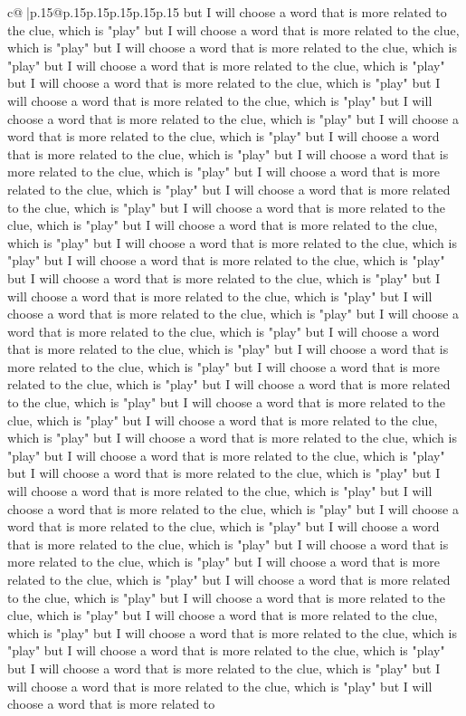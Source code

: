 \documentclass{article}
\begin{document}
{\begin{supertabular}{c@{$\;$}|p{.15\linewidth}@{}p{.15\linewidth}p{.15\linewidth}p{.15\linewidth}p{.15\linewidth}p{.15\linewidth}}
{{{but I will choose a word that is more related to the clue, which is "play" but I will choose a word that is more related to the clue, which is "play" but I will choose a word that is more related to the clue, which is "play" but I will choose a word that is more related to the clue, which is "play" but I will choose a word that is more related to the clue, which is "play" but I will choose a word that is more related to the clue, which is "play" but I will choose a word that is more related to the clue, which is "play" but I will choose a word that is more related to the clue, which is "play" but I will choose a word that is more related to the clue, which is "play" but I will choose a word that is more related to the clue, which is "play" but I will choose a word that is more related to the clue, which is "play" but I will choose a word that is more related to the clue, which is "play" but I will choose a word that is more related to the clue, which is "play" but I will choose a word that is more related to the clue, which is "play" but I will choose a word that is more related to the clue, which is "play" but I will choose a word that is more related to the clue, which is "play" but I will choose a word that is more related to the clue, which is "play" but I will choose a word that is more related to the clue, which is "play" but I will choose a word that is more related to the clue, which is "play" but I will choose a word that is more related to the clue, which is "play" but I will choose a word that is more related to the clue, which is "play" but I will choose a word that is more related to the clue, which is "play" but I will choose a word that is more related to the clue, which is "play" but I will choose a word that is more related to the clue, which is "play" but I will choose a word that is more related to the clue, which is "play" but I will choose a word that is more related to the clue, which is "play" but I will choose a word that is more related to the clue, which is "play" but I will choose a word that is more related to the clue, which is "play" but I will choose a word that is more related to the clue, which is "play" but I will choose a word that is more related to the clue, which is "play" but I will choose a word that is more related to the clue, which is "play" but I will choose a word that is more related to the clue, which is "play" but I will choose a word that is more related to the clue, which is "play" but I will choose a word that is more related to the clue, which is "play" but I will choose a word that is more related to the clue, which is "play" but I will choose a word that is more related to the clue, which is "play" but I will choose a word that is more related to the clue, which is "play" but I will choose a word that is more related to the clue, which is "play" but I will choose a word that is more related to the clue, which is "play" but I will choose a word that is more related to the clue, which is "play" but I will choose a word that is more related to the clue, which is "play" but I will choose a word that is more related to the clue, which is "play" but I will choose a word that is more related to }}}
\end{supertabular}}
\end{document}
